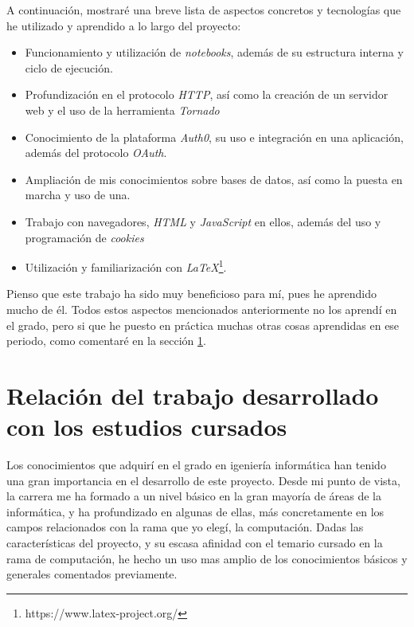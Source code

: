 \documentclass[11pt,spanish,listoffigures]{tfgetsinf}
\begin{document}
A continuación, mostraré una breve lista de aspectos concretos y tecnologías que he utilizado y aprendido a lo largo del proyecto:

\begin{itemize}

\item Funcionamiento y utilización de \textit{notebooks}, además de su estructura interna y ciclo de ejecución.

\item Profundización en el protocolo \textit{HTTP}, así como la creación de un servidor web y el uso de la herramienta \textit{Tornado}

\item Conocimiento de la plataforma \textit{Auth0}, su uso e integración en una aplicación, además del protocolo \textit{OAuth}.

\item Ampliación de mis conocimientos sobre bases de datos, así como la puesta en marcha y uso de una.

\item Trabajo con navegadores, \textit{HTML} y \textit{JavaScript} en ellos, además del uso y programación de \textit{cookies} 

\item Utilización y familiarización con \textit{LaTeX}\footnote{https://www.latex-project.org/}.
\end{itemize}

Pienso que este trabajo ha sido muy beneficioso para mí, pues he aprendido mucho de él. Todos estos aspectos mencionados anteriormente no los aprendí en el grado, pero si que he puesto en práctica muchas otras cosas aprendidas en ese periodo, como comentaré en la sección \ref{sec:estudios-cursados}.


\section{Relación del trabajo desarrollado con los estudios cursados}
\label{sec:estudios-cursados}

Los conocimientos que adquirí en el grado en igeniería informática han tenido una gran importancia en el desarrollo de este proyecto. Desde mi punto de vista, la carrera me ha formado a un nivel básico en la gran mayoría de áreas de la informática, y ha profundizado en algunas de ellas, más concretamente en los campos relacionados con la rama que yo elegí, la computación. Dadas las características del proyecto, y su escasa afinidad con el temario cursado en la rama de computación, he hecho un uso mas amplio de los conocimientos básicos y generales comentados previamente.
\end{document}
